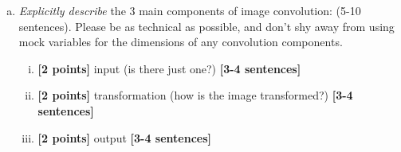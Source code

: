 \documentclass[11pt]{article}
\begin{document}
\begin{enumerate}[(a)]
\item 
\begin{tcolorbox}[colback=orange!5!white,colframe=orange!75!black]
\emph{Explicitly describe} the 3 main components of image convolution: (5-10 sentences). Please be as technical as possible, and don't shy away from using mock variables for the dimensions of any convolution components.
\end{tcolorbox}
\begin{enumerate}[(i)]
    \item \textbf{[2 points]} input (is there just one?) \textbf{[3-4 sentences]}
    
    \item \textbf{[2 points]} transformation (how is the image transformed?) \textbf{[3-4 sentences]} 
    
    \item \textbf{[2 points]} output \textbf{[3-4 sentences]}
\end{enumerate}
\end{enumerate}
\end{document}
